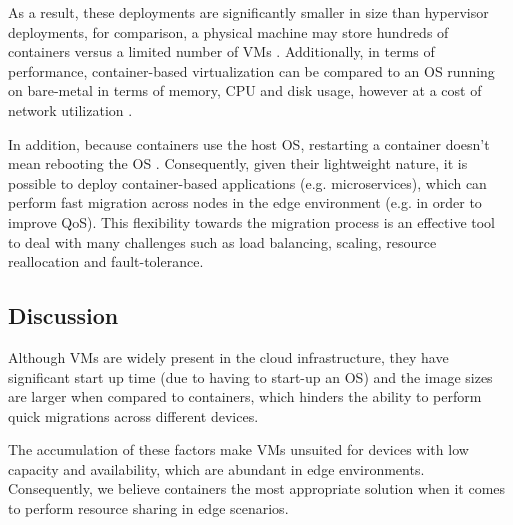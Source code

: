As a result, these deployments are significantly smaller in size than hypervisor deployments, for comparison, a physical machine may store hundreds of containers versus a limited number of VMs \cite{7036275}. Additionally, in terms of performance, container-based virtualization can be compared to an OS running on bare-metal in terms of memory, CPU and disk usage, however at a cost of network utilization \cite{preeth2015evaluation}.

In addition, because containers use the host OS, restarting a container doesn't mean rebooting the OS \cite{7036275}. Consequently, given their lightweight nature, it is possible to deploy container-based applications (e.g. microservices), which can perform fast migration across nodes in the edge environment (e.g. in order to improve QoS). This flexibility towards the migration process is an effective tool to deal with many challenges such as load balancing, scaling, resource reallocation and fault-tolerance. 

\subsection{Discussion}

Although VMs are widely present in the cloud infrastructure, they have significant start up time (due to having to start-up an OS) and the image sizes are larger when compared to containers, which hinders the ability to perform quick migrations across different devices. 

The accumulation of these factors make VMs unsuited for devices with low capacity and availability, which are abundant in edge environments. Consequently, we believe containers the most appropriate solution when it comes to perform resource sharing in edge scenarios. 